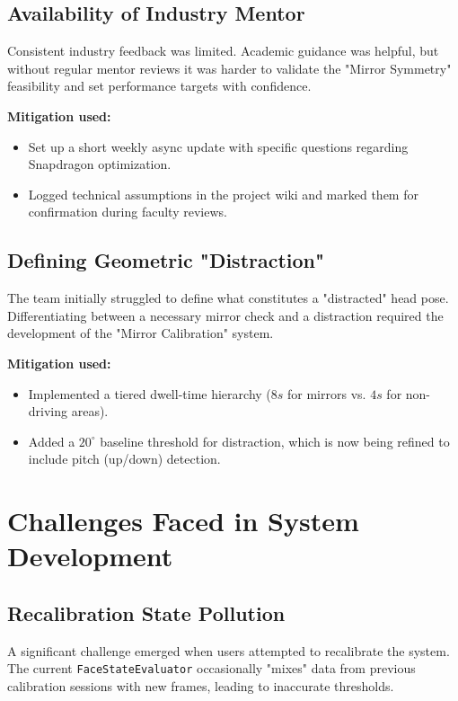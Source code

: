 \documentclass[11pt]{report}
\begin{document}
\subsection{Availability of Industry Mentor}
Consistent industry feedback was limited. Academic guidance was helpful, but without regular mentor reviews it was harder to validate the "Mirror Symmetry" feasibility and set performance targets with confidence.

\textbf{Mitigation used:}
\begin{itemize}
    \item Set up a short weekly async update with specific questions regarding Snapdragon optimization.
    \item Logged technical assumptions in the project wiki and marked them for confirmation during faculty reviews.
\end{itemize}

\subsection{Defining Geometric "Distraction"}
The team initially struggled to define what constitutes a "distracted" head pose. Differentiating between a necessary mirror check and a distraction required the development of the "Mirror Calibration" system.

\textbf{Mitigation used:}
\begin{itemize}
    \item Implemented a tiered dwell-time hierarchy ($8s$ for mirrors vs. $4s$ for non-driving areas).
    \item Added a $20^\circ$ baseline threshold for distraction, which is now being refined to include pitch (up/down) detection.
\end{itemize}

\section{Challenges Faced in System Development}

\subsection{Recalibration State Pollution}
A significant challenge emerged when users attempted to recalibrate the system. The current \texttt{FaceStateEvaluator} occasionally "mixes" data from previous calibration sessions with new frames, leading to inaccurate thresholds.
\end{document}
